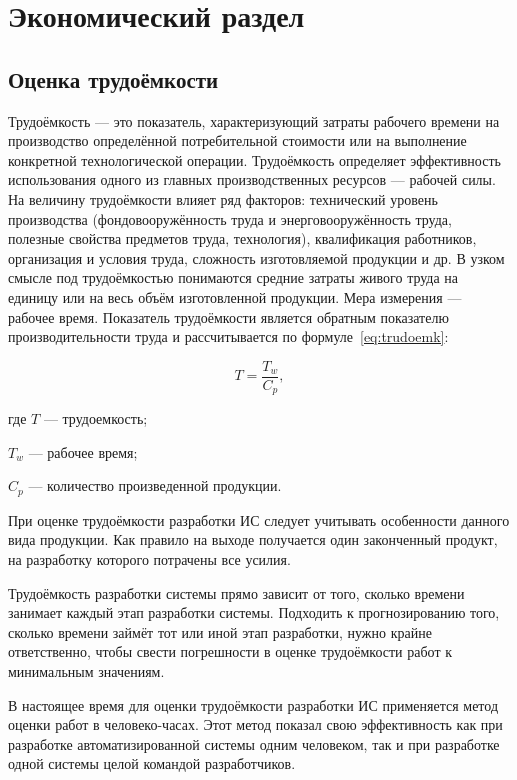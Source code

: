 \section{Экономический раздел}

\subsection{Оценка трудоёмкости}

Трудоёмкость --- это  показатель, характеризующий затраты рабочего времени на производство определённой потребительной стоимости или на выполнение конкретной технологической операции.
Трудоёмкость определяет эффективность использования одного из главных производственных ресурсов — рабочей силы. На величину трудоёмкости влияет ряд факторов: технический уровень производства (фондовооружённость труда и энерговооружённость труда, полезные свойства предметов труда, технология), квалификация работников, организация и условия труда, сложность изготовляемой продукции и др.
В узком смысле под трудоёмкостью понимаются средние затраты живого труда на единицу или на весь объём изготовленной продукции. Мера измерения --- рабочее время.
Показатель трудоёмкости является обратным показателю производительности труда и рассчитывается по формуле~\ref{eq:trudoemk}:

\begin{equation}
	\label{eq:trudoemk}
	T = \frac{T_{w}}{C_{p}},
\end{equation}
\begin{ESKDexplanation}
	\item где $T$ --- трудоемкость;
	\item $T_{w}$ --- рабочее время;
	\item $C_{p}$ --- количество произведенной продукции.
\end{ESKDexplanation}

При оценке трудоёмкости разработки ИС следует учитывать особенности данного вида продукции.
Как правило на выходе получается один законченный продукт, на разработку которого потрачены все усилия.

Трудоёмкость разработки системы прямо зависит от того, сколько времени занимает каждый этап разработки системы. Подходить к прогнозированию того, сколько времени займёт тот или иной этап разработки, нужно крайне ответственно, чтобы свести погрешности в оценке трудоёмкости работ к минимальным значениям.

В настоящее время для оценки трудоёмкости разработки ИС применяется метод оценки работ в человеко-часах. Этот метод показал свою эффективность как при разработке автоматизированной системы одним человеком, так и при разработке одной системы целой командой разработчиков.

